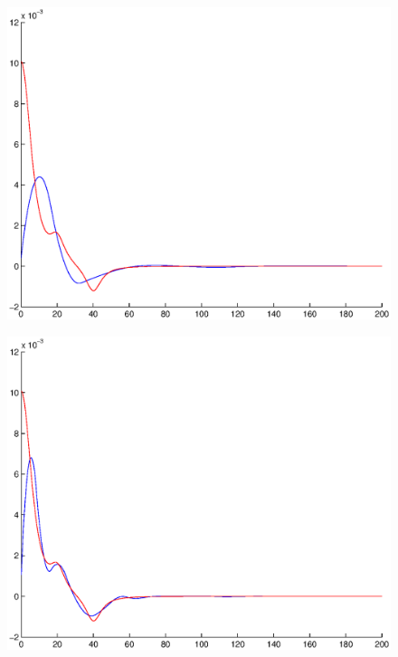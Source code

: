 \documentclass[A4paper,11pt]{article}
\theoremstyle{definition}
\begin{document}
\begin{figure}[H]
\centering
\begin{minipage}{.33\textwidth}
  \centering
  \vspace{0.22cm}
  \includegraphics[scale=0.25]{pictures/Example7/Fig2.eps}
  \label{fig:7_2}
\end{minipage}%
\begin{minipage}{.33\textwidth}
  \centering
  \vspace{0.2cm}
  \includegraphics[scale=0.25]{pictures/Example7/Fig3.eps}
  \label{fig:7_3}
\end{minipage}%

\end{figure}
\end{document}
